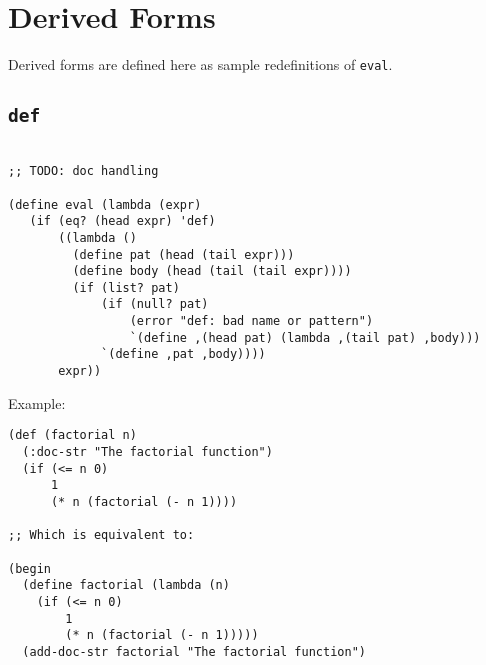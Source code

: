 \section{Derived Forms}

Derived forms are defined here as sample redefinitions of \texttt{eval}.

\subsection*{\texttt{def}}

\begin{verbatim}

;; TODO: doc handling

(define eval (lambda (expr)
   (if (eq? (head expr) 'def)
       ((lambda ()
         (define pat (head (tail expr)))
         (define body (head (tail (tail expr))))
         (if (list? pat)
             (if (null? pat)
                 (error "def: bad name or pattern")
                 `(define ,(head pat) (lambda ,(tail pat) ,body)))
             `(define ,pat ,body))))
       expr))

\end{verbatim}

Example:

\begin{verbatim}
(def (factorial n)
  (:doc-str "The factorial function")
  (if (<= n 0)
      1
      (* n (factorial (- n 1))))

;; Which is equivalent to:

(begin
  (define factorial (lambda (n)
    (if (<= n 0)
        1
        (* n (factorial (- n 1)))))
  (add-doc-str factorial "The factorial function")
\end{verbatim}
